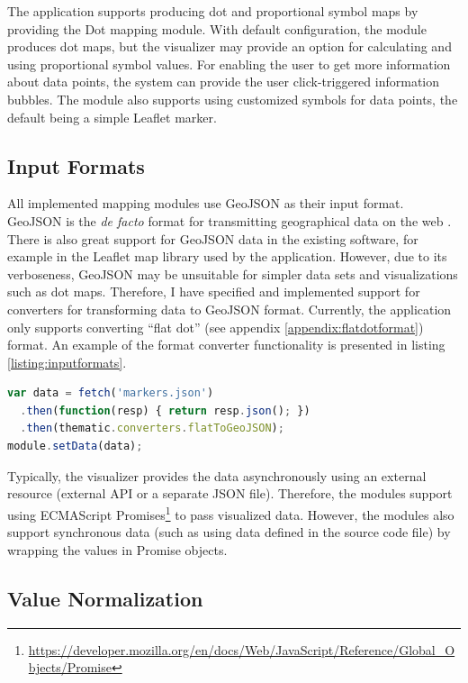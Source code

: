 The application supports producing dot and proportional symbol maps by providing the Dot mapping module. With default configuration, the module produces dot maps, but the visualizer may provide an option for calculating and using proportional symbol values. For enabling the user to get more information about data points, the system can provide the user click-triggered information bubbles. The module also supports using customized symbols for data points, the default being a simple Leaflet marker.

\subsection{Input Formats}

All implemented mapping modules use GeoJSON as their input format. GeoJSON is the \emph{de facto} format for transmitting geographical data on the web \citep{bostock_code_2013}. There is also great support for GeoJSON data in the existing software, for example in the Leaflet map library used by the application. However, due to its verboseness, GeoJSON may be unsuitable for simpler data sets and visualizations such as dot maps. Therefore, I have specified and implemented support for converters for transforming data to GeoJSON format. Currently, the application only supports converting ``flat dot'' (see appendix \ref{appendix:flatdotformat}) format. An example of the format converter functionality is presented in listing \ref{listing:inputformats}.

\begin{lstlisting}[caption=An example code for using the flat dot input format converter.,language=JavaScript,label=listing:inputformats]
var data = fetch('markers.json')
  .then(function(resp) { return resp.json(); })
  .then(thematic.converters.flatToGeoJSON);
module.setData(data);
\end{lstlisting}

Typically, the visualizer provides the data asynchronously using an external resource (external API or a separate JSON file). Therefore, the modules support using ECMAScript Promises\footnote{\url{https://developer.mozilla.org/en/docs/Web/JavaScript/Reference/Global_Objects/Promise}} to pass visualized data. However, the modules also support synchronous data (such as using data defined in the source code file) by wrapping the values in Promise objects.

\subsection{Value Normalization}

